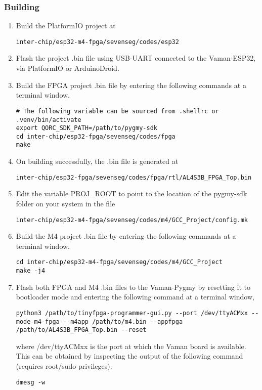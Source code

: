 \subsubsection{Building}
\begin{enumerate}
    \item Build the PlatformIO project at
    \begin{lstlisting}
inter-chip/esp32-m4-fpga/sevenseg/codes/esp32
    \end{lstlisting}
    \item Flash the project .bin file using USB-UART connected to the 
    Vaman-ESP32, via PlatformIO or ArduinoDroid.
    \item Build the FPGA project .bin file by entering the following commands at
    a terminal window.
    \begin{lstlisting}
# The following variable can be sourced from .shellrc or .venv/bin/activate
export QORC_SDK_PATH=/path/to/pygmy-sdk
cd inter-chip/esp32-fpga/sevenseg/codes/fpga
make
    \end{lstlisting}
    \item On building successfully, the .bin file is generated at
    \begin{lstlisting}
inter-chip/esp32-fpga/sevenseg/codes/fpga/rtl/AL4S3B_FPGA_Top.bin
    \end{lstlisting}
    \item Edit the variable PROJ\_ROOT to point to the location of the pygmy-sdk
    folder on your system in the file
    \begin{lstlisting}
inter-chip/esp32-m4-fpga/sevenseg/codes/m4/GCC_Project/config.mk
    \end{lstlisting}
    \item Build the M4 project .bin file by entering the following commands at a
    terminal window.
    \begin{lstlisting}
cd inter-chip/esp32-m4-fpga/sevenseg/codes/m4/GCC_Project
make -j4
    \end{lstlisting}
    \item Flash both FPGA and M4 .bin files to the Vaman-Pygmy by resetting it
    to bootloader mode and entering the following command at a terminal window,
    \begin{lstlisting}
python3 /path/to/tinyfpga-programmer-gui.py --port /dev/ttyACMxx --mode m4-fpga --m4app /path/to/m4.bin --appfpga /path/to/AL4S3B_FPGA_Top.bin --reset
    \end{lstlisting}
    where /dev/ttyACMxx is the port at which the Vaman board is available. This
    can be obtained by inspecting the output of the following command (requires
    root/sudo privileges).
    \begin{lstlisting}
dmesg -w
    \end{lstlisting}
\end{enumerate}

